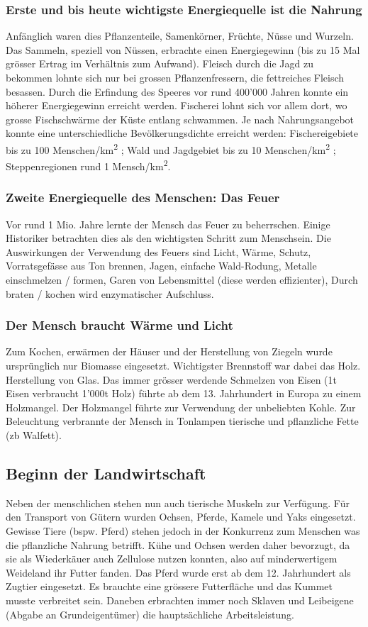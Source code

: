 \documentclass[10pt, openright=true]{scrartcl}
\begin{document}
\subsubsection{Erste und bis heute wichtigste Energiequelle ist die Nahrung}
Anfänglich waren dies Pflanzenteile, Samenkörner, Früchte, Nüsse und Wurzeln. Das Sammeln, speziell von Nüssen, erbrachte einen Energiegewinn (bis zu 15 Mal grösser Ertrag im Verhältnis zum Aufwand). Fleisch durch die Jagd zu bekommen lohnte sich nur bei grossen Pflanzenfressern, die fettreiches Fleisch besassen. Durch die Erfindung des Speeres vor rund 400'000 Jahren konnte ein höherer Energiegewinn erreicht werden. Fischerei lohnt sich vor allem dort, wo grosse Fischschwärme der Küste entlang schwammen. Je nach Nahrungsangebot konnte eine unterschiedliche Bevölkerungsdichte erreicht werden: Fischereigebiete bis zu 100 Menschen/km\textsuperscript{2} ; Wald und Jagdgebiet bis zu 10 Menschen/km\textsuperscript{2} ; Steppenregionen rund 1 Mensch/km\textsuperscript{2}. 
\subsubsection{Zweite Energiequelle des Menschen: Das Feuer}
Vor rund 1 Mio. Jahre lernte der Mensch das Feuer zu beherrschen. Einige Historiker betrachten dies als den wichtigsten Schritt zum Menschsein. Die Auswirkungen der Verwendung des Feuers sind Licht, Wärme, Schutz, Vorratsgefässe aus Ton brennen, Jagen, einfache Wald-Rodung, Metalle einschmelzen / formen, Garen von Lebensmittel (diese werden effizienter), Durch braten / kochen wird enzymatischer Aufschluss.
\subsubsection{Der Mensch braucht Wärme und Licht}
Zum Kochen, erwärmen der Häuser und der Herstellung von Ziegeln wurde ursprünglich nur Biomasse eingesetzt. Wichtigster Brennstoff war dabei das Holz. Herstellung von Glas. Das immer grösser werdende Schmelzen von Eisen (1t Eisen verbraucht 1’000t Holz) führte ab dem 13. Jahrhundert in Europa zu einem Holzmangel. Der Holzmangel führte zur Verwendung der unbeliebten Kohle. Zur Beleuchtung verbrannte der Mensch in Tonlampen tierische und pflanzliche Fette (zb Walfett).
\subsection{Beginn der Landwirtschaft}
Neben der menschlichen stehen nun auch tierische Muskeln zur Verfügung. Für den Transport von Gütern wurden Ochsen, Pferde, Kamele und Yaks eingesetzt. Gewisse Tiere (bspw. Pferd) stehen jedoch in der Konkurrenz zum Menschen was die pflanzliche Nahrung betrifft. Kühe und Ochsen werden daher bevorzugt, da sie als Wiederkäuer auch Zellulose nutzen konnten, also auf minderwertigem Weideland ihr Futter fanden. Das Pferd wurde erst ab dem 12. Jahrhundert als Zugtier eingesetzt. Es brauchte eine grössere Futterfläche und das Kummet musste verbreitet sein. Daneben erbrachten immer noch Sklaven und Leibeigene (Abgabe an Grundeigentümer) die hauptsächliche Arbeitsleistung. 
\end{document}
